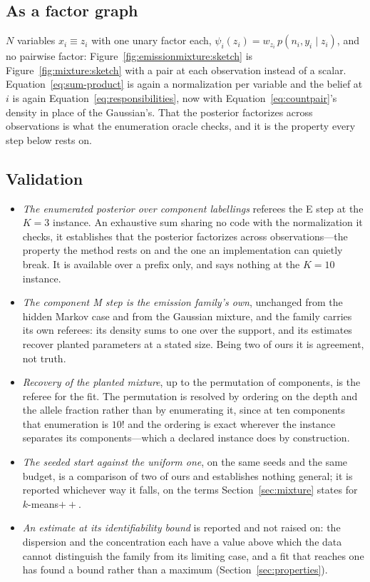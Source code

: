 \documentclass[11pt,a4paper]{article}
\begin{document}
\subsection{As a factor graph}
$N$ variables $x_i \equiv z_i$ with one unary factor each,
$\psi_i(z_i) = w_{z_i}\, p(n_i, y_i \mid z_i)$, and no pairwise factor:
Figure~\ref{fig:emissionmixture:sketch} is
Figure~\ref{fig:mixture:sketch} with a pair at each observation instead of a
scalar. Equation~\ref{eq:sum-product} is again a normalization per variable
and the belief at $i$ is again Equation~\ref{eq:responsibilities}, now with
Equation~\ref{eq:countpair}'s density in place of the Gaussian's. That the
posterior factorizes across observations is what the enumeration oracle
checks, and it is the property every step below rests on.



\subsection{Validation}
\label{sec:emissionmixture:validation}
\begin{itemize}
  \item \emph{The enumerated posterior over component labellings} referees the
    E step at the $K = 3$ instance. An exhaustive sum sharing no code with the
    normalization it checks, it establishes that the posterior factorizes
    across observations---the property the method rests on and the one an
    implementation can quietly break. It is available over a prefix only, and
    says nothing at the $K = 10$ instance.
  \item \emph{The component M step is the emission family's own}, unchanged
    from the hidden Markov case and from the Gaussian mixture, and the family
    carries its own referees: its density sums to one over the support, and
    its estimates recover planted parameters at a stated size. Being two of
    ours it is agreement, not truth.
  \item \emph{Recovery of the planted mixture}, up to the permutation of
    components, is the referee for the fit. The permutation is resolved by
    ordering on the depth and the allele fraction rather than by enumerating
    it, since at ten components that enumeration is $10!$ and the ordering is
    exact wherever the instance separates its components---which a declared
    instance does by construction.
  \item \emph{The seeded start against the uniform one}, on the same seeds and
    the same budget, is a comparison of two of ours and establishes nothing
    general; it is reported whichever way it falls, on the terms
    Section~\ref{sec:mixture} states for $k$-means${+}{+}$.
  \item \emph{An estimate at its identifiability bound} is reported and not
    raised on: the dispersion and the concentration each have a value above
    which the data cannot distinguish the family from its limiting case, and a
    fit that reaches one has found a bound rather than a maximum
    (Section~\ref{sec:properties}).
\end{itemize}
\end{document}
